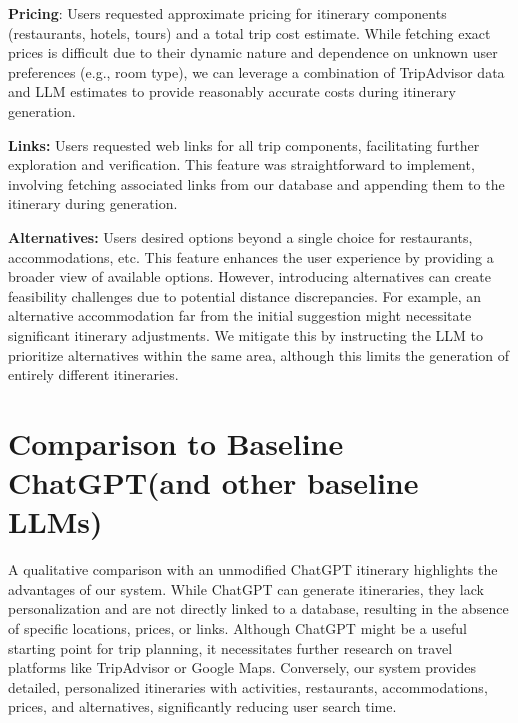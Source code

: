 \documentclass[12pt,a4paper]{report}
\begin{document}
\begin{description}
\item{\textbf{Pricing}: Users requested approximate pricing for itinerary components (restaurants, hotels, tours) and a total trip cost estimate. While fetching exact prices is difficult due to their dynamic nature and dependence on unknown user preferences (e.g., room type), we can leverage a combination of TripAdvisor data and LLM estimates to provide reasonably accurate costs during itinerary generation.}
\item{\textbf{Links:} Users requested web links for all trip components, facilitating further exploration and verification. This feature was straightforward to implement, involving fetching associated links from our database and appending them to the itinerary during generation.}
\item{\textbf{Alternatives:} Users desired options beyond a single choice for restaurants, accommodations, etc. This feature enhances the user experience by providing a broader view of available options. However, introducing alternatives can create feasibility challenges due to potential distance discrepancies. For example, an alternative accommodation far from the initial suggestion might necessitate significant itinerary adjustments. We mitigate this by instructing the LLM to prioritize alternatives within the same area, although this limits the generation of entirely different itineraries.}
\end{description}

\section{Comparison to Baseline ChatGPT(and other baseline LLMs)}

A qualitative comparison with an unmodified ChatGPT itinerary highlights the advantages of our system. While ChatGPT can generate itineraries, they lack personalization and are not directly linked to a database, resulting in the absence of specific locations, prices, or links. Although ChatGPT might be a useful starting point for trip planning, it necessitates further research on travel platforms like TripAdvisor or Google Maps. Conversely, our system provides detailed, personalized itineraries with activities, restaurants, accommodations, prices, and alternatives, significantly reducing user search time.


\end{document}
